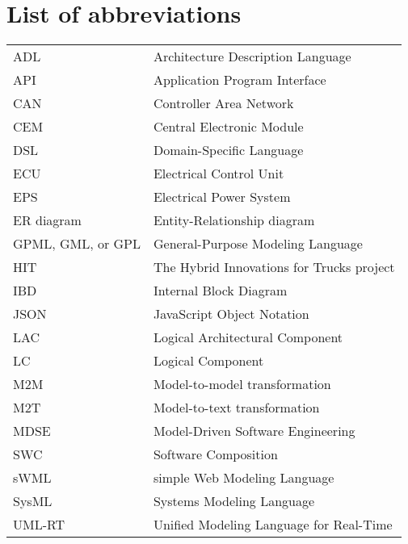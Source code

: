 
\thispagestyle{plain}			%

\section*{List of abbreviations}

\begin{table}[H]
\begin{tabular}{ll}
ADL & Architecture Description Language \\
API & Application Program Interface \\
CAN & Controller Area Network \\
CEM & Central Electronic Module \\
DSL & Domain-Specific Language \\
ECU & Electrical Control Unit \\
EPS & Electrical Power System \\
ER diagram & Entity-Relationship diagram \\
GPML, GML, or GPL & General-Purpose Modeling Language \\
HIT & The Hybrid Innovations for Trucks project \\
IBD & Internal Block Diagram \\
JSON & JavaScript Object Notation \\
LAC & Logical Architectural Component \\
LC & Logical Component \\
M2M & Model-to-model transformation \\
M2T & Model-to-text transformation \\
MDSE & Model-Driven Software Engineering \\
SWC & Software Composition \\
sWML & simple Web Modeling Language \\
SysML & Systems Modeling Language \\
UML-RT &  Unified Modeling Language for Real-Time \\
\end{tabular}
\end{table}

